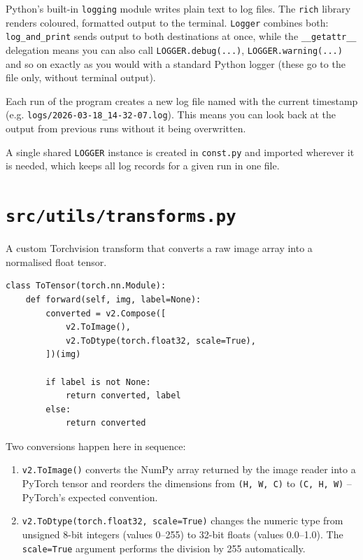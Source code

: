 \documentclass[11pt, a4paper]{article}
\newenvironment{filebox}[1]{%
  \begin{tcolorbox}[
    colback=filebg, colframe=fileframe,
    fonttitle=\bfseries\ttfamily, title=#1,
    breakable, enhanced
  ]
}{%
  \end{tcolorbox}
}
\begin{document}
Python's built-in \texttt{logging} module writes plain text to log files.
The \texttt{rich} library renders coloured, formatted output to the terminal.
\texttt{Logger} combines both: \texttt{log\_and\_print} sends output to both
destinations at once, while the \texttt{\_\_getattr\_\_} delegation means you
can also call \texttt{LOGGER.debug(...)}, \texttt{LOGGER.warning(...)} and so
on exactly as you would with a standard Python logger (these go to the file
only, without terminal output).

Each run of the program creates a new log file named with the current
timestamp (e.g. \texttt{logs/2026-03-18\_14-32-07.log}). This means you can
look back at the output from previous runs without it being overwritten.

A single shared \texttt{LOGGER} instance is created in \texttt{const.py} and
imported wherever it is needed, which keeps all log records for a given run in
one file.

\section{\texttt{src/utils/transforms.py}}

\begin{filebox}{src/utils/transforms.py}
  A custom Torchvision transform that converts a raw image array into a
  normalised float tensor.
\end{filebox}

\begin{lstlisting}
class ToTensor(torch.nn.Module):
    def forward(self, img, label=None):
        converted = v2.Compose([
            v2.ToImage(),
            v2.ToDtype(torch.float32, scale=True),
        ])(img)

        if label is not None:
            return converted, label
        else:
            return converted
\end{lstlisting}

Two conversions happen here in sequence:

\begin{enumerate}[nosep]
  \item \texttt{v2.ToImage()} converts the NumPy array returned by the image
        reader into a PyTorch tensor and reorders the dimensions from
        \texttt{(H, W, C)} to \texttt{(C, H, W)} -- PyTorch's expected
        convention.
  \item \texttt{v2.ToDtype(torch.float32, scale=True)} changes the numeric
        type from unsigned 8-bit integers (values 0--255) to 32-bit floats
        (values 0.0--1.0). The \texttt{scale=True} argument performs the
        division by 255 automatically.
\end{enumerate}
\end{document}
